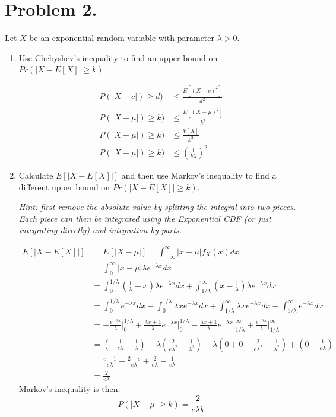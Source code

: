 \documentclass{article}
\newcommand{\1}{\mathbf{1}}
\begin{document}
\section*{Problem 2.}
Let $X$ be an exponential random variable with parameter $\lambda > 0$.
\begin{enumerate}
    \item Use Chebyshev's inequality to find an upper bound on $Pr(|X- E[X] | \geq k)$

    \begin{align*}
        P(|X-c|) \geq d) &\leq \frac{E[(X-c)^2]}{d^2} \\
        P(|X-\mu|) \geq k) &\leq \frac{E[(X-\mu)^2]}{k^2} \\
        P(|X-\mu|) \geq k) &\leq \frac{V[X]}{k^2} \\
        P(|X-\mu|) \geq k) &\leq \left(\frac{1}{k\lambda}\right)^2
    \end{align*}

    \item Calculate $E[ |X - E[X]|]$ and then use Markov's inequality to find a different upper bound on $Pr(|X- E[X] | \geq k)$.\par
    {\it Hint: first remove the absolute value by splitting the integral into two pieces. Each piece can then be integrated using the Exponential CDF (or just integrating directly) and integration by parts.}
    
    \begin{align*}
        E[|X - E[X]|] &= E[|X - \mu|] = \int_{-\infty}^\infty |x-\mu|f_X(x) dx \\
        &= \int_{0}^\infty |x-\mu|\lambda e^{-\lambda x} dx \\
        &= \int_0^{1/\lambda} \left(\frac{1}{\lambda} - x\right)\lambda e^{-\lambda x} dx 
            + \int_{1/\lambda}^\infty \left(x - \frac{1}{\lambda} \right)\lambda e^{-\lambda x} dx \\
        &= \int_0^{1/\lambda} e^{-\lambda x} dx 
            - \int_0^{1/\lambda} \lambda xe^{-\lambda x} dx
            + \int_{1/\lambda}^\infty \lambda  xe^{-\lambda x} dx 
            - \int_{1/\lambda}^\infty e^{-\lambda x} dx \\
        &= -\frac{e^{-\lambda x}}{\lambda} \bigg|_0^{1/\lambda} 
            + \frac{\lambda x+1}{\lambda}e^{-\lambda x} \bigg|_0^{1/\lambda}
            - \frac{\lambda x+1}{\lambda}e^{-\lambda x} \bigg|_{1/\lambda}^\infty 
            + \frac{e^{-\lambda x}}{\lambda} \bigg|_{1/\lambda}^\infty \\
        &= \left(-\frac{1}{e\lambda}+ \frac{1}{\lambda}\right) 
            + \lambda \left(\frac{2}{e\lambda^2} - \frac{1}{\lambda^2} \right) 
            - \lambda \left(0 + 0 - \frac{2}{e\lambda^2} - \frac{1}{\lambda^2}\right) 
            + \left(0 - \frac{1}{e\lambda}\right) \\
        &= \frac{e-1}{e\lambda} 
           + \frac{2-e}{e\lambda} 
           + \frac{2}{e\lambda}
           - \frac{1}{e\lambda} \\
        &= \frac{2}{e\lambda}
    \end{align*}
    Markov's inequality is then:
    $$P(|X-\mu|\geq k) = \frac{2}{e \lambda k}$$


\end{enumerate}
\end{document}
